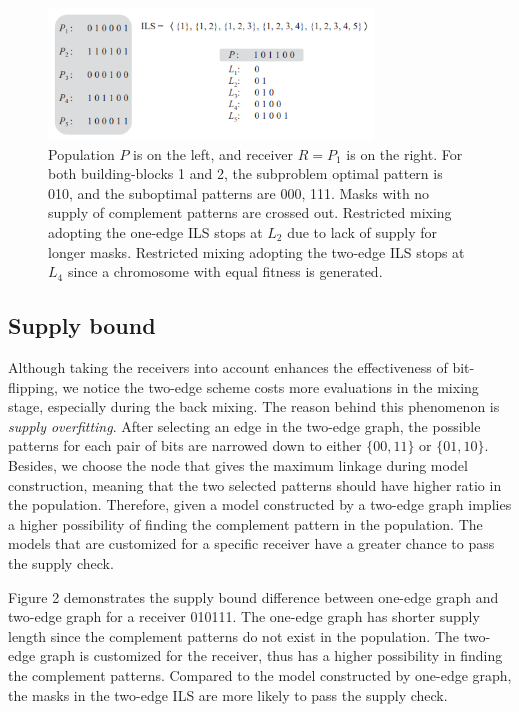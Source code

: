 \begin{figure}
\centering
\includegraphics[width=3.4in]{SupplyBound}
\caption{Population $ P $ is on the left, and receiver $ R  = P_{1} $ is on the right. For both building-blocks 1 and 2, the subproblem optimal pattern is 010, and the suboptimal patterns are 000, 111. Masks with no supply of complement patterns are crossed out. Restricted mixing adopting the one-edge ILS stops at $ L_{2}$ due to lack of supply for longer masks. Restricted mixing adopting the two-edge ILS stops at $ L_{4} $ since a chromosome with equal fitness is generated.}
\end{figure}




\subsection{Supply bound}
Although taking the receivers into account enhances the effectiveness of bit-flipping, we notice the two-edge scheme costs more evaluations in the mixing stage, especially during the back mixing. The reason behind this phenomenon is \textit{supply overfitting}. After selecting an edge in the two-edge graph, the possible patterns for each pair of bits are narrowed down to either $\{00, 11\}$ or $\{01, 10\}$. Besides, we choose the node that gives the maximum linkage during model construction, meaning that the two selected patterns should have higher ratio in the population. Therefore, given a model constructed by a two-edge graph implies a higher possibility of finding the complement pattern in the population. The models that are customized for a specific receiver have a greater chance to pass the supply check. 


Figure 2 demonstrates the supply bound difference between one-edge graph and two-edge graph for a receiver 010111. The one-edge graph has shorter supply length since the complement patterns do not exist in the population. The two-edge graph is customized for the receiver, thus has a higher possibility in finding the complement patterns. Compared to the model constructed by one-edge graph, the masks in the two-edge ILS are more likely to pass the supply check. 



